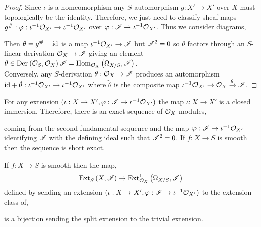 \documentclass[12pt]{article}
\begin{document}
\begin{proof}
Since $\iota$ is a homeomorphism any $S$-automorphism $g : X' \to X'$ over $X$ must topologically be the identity. Therefore, we just need to classify sheaf maps $g^\# : \varphi : \iota^{-1} \mathcal{O}_{X'} \to \iota^{-1} \mathcal{O}_{X'}$ over $\varphi : \mathscr{I} \to \iota^{-1} \mathcal{O}_{X'}$. Thus we consider diagrams,
\begin{center}
\end{center}
Then $\theta = g^\# - \mathrm{id}$ is a map $\iota^{-1} \mathcal{O}_{X'} \to \mathscr{I}$ but $\mathscr{I}^2 = 0$ so $\theta$ factors through an $S$-linear derivation $\mathcal{O}_{X} \to \mathscr{I}$ giving an element $\theta \in \mathrm{Der}_{} \left( \mathcal{O}_{S}, \mathcal{O}_{X} \right){\mathscr{I}} = \mathrm{Hom}_{\mathcal{O}_{X}} \left( \Omega_{X/S}, \mathscr{I} \right)$. 
\bigskip\\
Conversely, any $S$-derivation $\theta : \mathcal{O}_{X} \to \mathscr{I}$ produces an automorphism $\mathrm{id} + \tilde{\theta} : \iota^{-1} \mathcal{O}_{X'} \to \iota^{-1} \mathcal{O}_{X'}$ where $\tilde{\theta}$ is the composite map $\iota^{-1} \mathcal{O}_{X'} \to \mathcal{O}_{X} \xrightarrow{\theta} \mathscr{I}$.
\end{proof}

\begin{rmk}
For any extension $(\iota : X \to X', \varphi : \mathscr{I} \to \iota^{-1} \mathcal{O}_{X'})$ the map $\iota : X \to X'$ is a closed immersion. Therefore, there is an exact sequence of $\mathcal{O}_{X}$-modules,
\begin{center}
\end{center}
coming from the second fundamental sequence and the map $\varphi : \mathscr{I} \to \iota^{-1} \mathcal{O}_{X'}$ identifying $\mathscr{I}$ with the defining ideal such that $\mathscr{I}^2 = 0$. If $f : X \to S$ is smooth then the sequence is short exact.
\end{rmk}

\begin{prop}
If $f : X \to S$ is smooth then the map,
\[ \mathrm{Ext}^{}_{S} \left( X, \mathscr{I} \right) \to \mathrm{Ext}^{1}_{\mathcal{O}_{X}} \left( \Omega_{X/S}, \mathscr{I} \right) \]
defined by sending an extension $(\iota : X \to X', \varphi : \mathscr{I} \to \iota^{-1} \mathcal{O}_{X'})$ to the extension class of,
\begin{center}
\end{center}
is a bijection sending the split extension to the trivial extension.
\end{prop}
\end{document}

